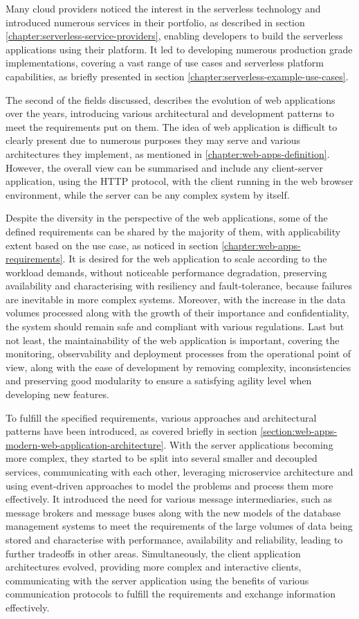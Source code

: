 Many cloud providers noticed the interest in the serverless technology and introduced numerous services in their portfolio, as described in section \ref{chapter:serverless-service-providers}, enabling developers to build the serverless applications using their platform.
It led to developing numerous production grade implementations, covering a vast range of use cases and serverless platform capabilities, as briefly presented in section \ref{chapter:serverless-example-use-cases}.

The second of the fields discussed, describes the evolution of web applications over the years, introducing various architectural and development patterns to meet the requirements put on them.
The idea of web application is difficult to clearly present due to numerous purposes they may serve and various architectures they implement, as mentioned in \ref{chapter:web-apps-definition}. However, the overall view can be summarised and include any client-server application, using the HTTP protocol, with the client running in the web browser environment, while the server can be any complex system by itself.

Despite the diversity in the perspective of the web applications, some of the defined requirements can be shared by the majority of them, with applicability extent based on the use case, as noticed in section \ref{chapter:web-apps-requirements}.
It is desired for the web application to scale according to the workload demands, without noticeable performance degradation, preserving availability and characterising with resiliency and fault-tolerance, because failures are inevitable in more complex systems. Moreover, with the increase in the data volumes processed along with the growth of their importance and confidentiality, the system should remain safe and compliant with various regulations. Last but not least, the maintainability of the web application is important, covering the monitoring, observability and deployment processes from the operational point of view, along with the ease of development by removing complexity, inconsistencies and preserving good modularity to ensure a satisfying agility level when developing new features.

To fulfill the specified requirements, various approaches and architectural patterns have been introduced, as covered briefly in section \ref{section:web-apps-modern-web-application-architecture}.
With the server applications becoming more complex, they started to be split into several smaller and decoupled services, communicating with each other, leveraging microservice architecture and using event-driven approaches to model the problems and process them more effectively.
It introduced the need for various message intermediaries, such as message brokers and message buses along with the new models of the database management systems to meet the requirements of the large volumes of data being stored and characterise with performance, availability and reliability, leading to further tradeoffs in other areas.
Simultaneously, the client application architectures evolved, providing more complex and interactive clients, communicating with the server application using the benefits of various communication protocols to fulfill the requirements and exchange information effectively.

